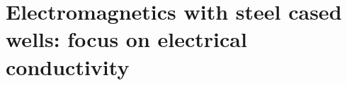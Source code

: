 
\chapter{Electromagnetics with steel cased wells: focus on electrical conductivity}
\label{ch:casing_em_conductivity}
